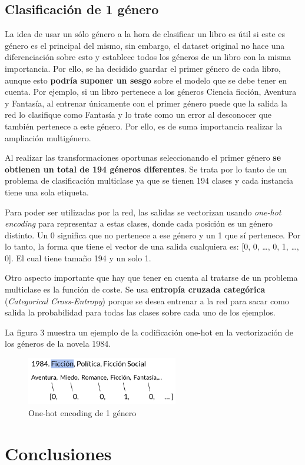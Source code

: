 \documentclass[12pt,a4paper, xcolor=table]{article}
\begin{document}
\newpage


\subsection{Clasificación de 1 género}

La idea de usar un sólo género a la hora de clasificar un libro es útil si este es género es el principal del mismo, sin embargo, el dataset original no hace una diferenciación sobre esto y establece todos los géneros de un libro con la misma importancia. Por ello, se ha decidido guardar el primer género de cada libro, aunque esto \textbf{podría suponer un sesgo }sobre el modelo que se debe tener en cuenta. Por ejemplo, si un libro pertenece a los géneros Ciencia ficción, Aventura y Fantasía, al entrenar únicamente con el primer género puede que la salida la red lo clasifique como Fantasía y lo trate como un error al desconocer que también pertenece a este género. Por ello, es de suma importancia realizar la ampliación multigénero.

\vspace{3mm}

Al realizar las transformaciones oportunas seleccionando el primer género \textbf{se obtienen un total de 194 géneros diferentes}. Se trata por lo tanto de un problema de clasificación multiclase ya que se tienen 194 clases y cada instancia tiene una sola etiqueta.

\vspace{3mm}

Para poder ser utilizadas por la red, las salidas se vectorizan usando \textit{one-hot encoding} para representar a estas clases, donde cada posición es un género distinto. Un 0 significa que no pertenece a ese género y un 1 que sí pertenece. Por lo tanto, la forma que tiene el vector de una salida cualquiera es: [0, 0, …, 0, 1, …, 0]. El cual tiene tamaño 194 y un solo 1.

\vspace{3mm}

Otro aspecto importante que hay que tener en cuenta al tratarse de un problema multiclase es la función de coste. Se usa \textbf{entropía cruzada categórica} (\textit{Categorical Cross-Entropy}) porque se desea entrenar a la red para sacar como salida la probabilidad para todas las clases sobre cada uno de los ejemplos.

\vspace{3mm}

La figura 3 muestra un ejemplo de la codificación one-hot en la vectorización de los géneros de la novela 1984.

  \begin{figure}[!h]
    \centering
    \includegraphics[width=250px]{img/1984_Genres.png}
    \caption{One-hot encoding de 1 género}
    \end{figure}

\newpage

\section{Conclusiones}

\clearpage



\end{document}
